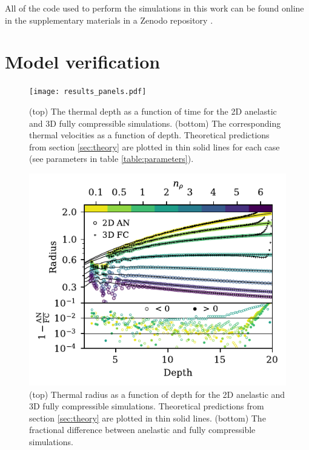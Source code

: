 \documentclass[twocolumn, amsmath, amsfonts, amssymb, trackchanges]{aastex62}
\begin{document}
All of the code used to perform the simulations in this work can be found online in the supplementary materials in a Zenodo repository \citep{supp_andersetall2019}.


\section{Model verification}
\label{sec:results}
\begin{figure}[t!]
    \texttt{[image: results\_panels.pdf]}
    \caption{
	(top) The thermal depth as a function of time for the 2D anelastic and 3D fully compressible simulations.
	(bottom) The corresponding thermal velocities as a function of depth.
	Theoretical predictions from section \ref{sec:theory} are plotted in thin solid lines for each case (see parameters in table \ref{table:parameters}).
    \label{fig:results_panels} }
\end{figure}

\begin{figure}[t!]
    \includegraphics[width=\columnwidth]{diff_AN_FC.pdf}
    \caption{
	(top) Thermal radius as a function of depth for the 2D anelastic and 3D fully compressible simulations.
	Theoretical predictions from section \ref{sec:theory} are plotted in thin solid lines.
	(bottom) The fractional difference between anelastic and fully compressible simulations.
    \label{fig:diff} }
\end{figure}
\end{document}
